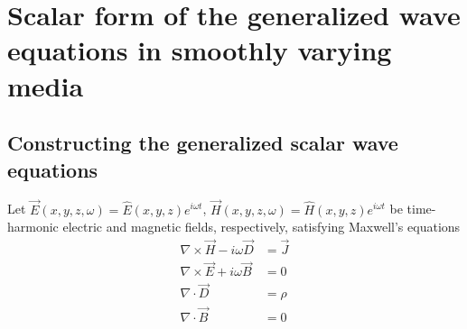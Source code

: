 \documentclass[twocolumn,secnumarabic,amssymb, nobibnotes, aps, prd]{revtex4-1}
\begin{document}





\section{Scalar form of the generalized wave equations in smoothly varying media}
\subsection{Constructing the generalized scalar wave equations}

Let $\overrightarrow{E}(x,y,z,\omega) = \hat{E}(x,y,z)e^{i \omega t}$, $\overrightarrow{H}(x,y,z,\omega) = \hat{H}(x,y,z)e^{i \omega t}$ be time-harmonic electric and magnetic fields, respectively, satisfying Maxwell's equations
\begin{subequations}

	\begin{align}
        \nabla \times \overrightarrow{H}-i \omega \overrightarrow{D} &= \overrightarrow{J}  \label{eqns:CurlH_Maxwell}	\\	
        \nabla \times \overrightarrow{E} + i \omega \overrightarrow{B} &= 0  \label{eqns:CurlE_Maxwell} \\
		\nabla \cdot \overrightarrow{D} &=  \rho	 \label{eqns:DivD_Maxwell}\\		
		\nabla \cdot \overrightarrow{B} &= 0	
	\end{align}
\end{subequations}
 
\end{document}
